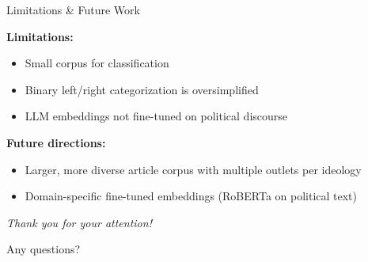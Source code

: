 \documentclass[11pt]{beamer}
\begin{document}
\begin{frame}{Limitations \& Future Work}

\textbf{Limitations:}
\begin{itemize}
    \item Small corpus for classification
    \item Binary left/right categorization is oversimplified
    \item LLM embeddings not fine-tuned on political discourse
\end{itemize}

\vspace{0.3cm}

\textbf{Future directions:}
\begin{itemize}
    \item Larger, more diverse article corpus with multiple outlets per ideology
    \item Domain-specific fine-tuned embeddings (RoBERTa on political text)
\end{itemize}

\end{frame}

\begin{frame}
  \centering \Huge
  \emph{Thank you for your attention!}
  
  \vspace{1cm}
  \Large Any questions?
\end{frame}
\end{document}
